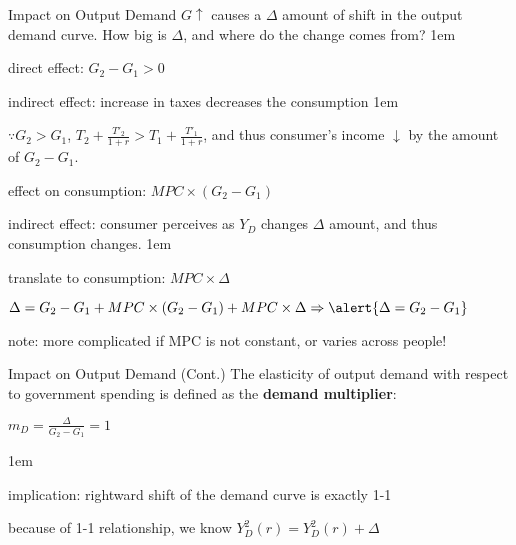 \documentclass[11pt,aspectratio=43]{beamer}
\let\olditemize=\itemize
\let\endolditemize=\enditemize
\renewenvironment{itemize}{\olditemize \itemsep1em}{\endolditemize}
\let\oldenumerate=\enumerate
\let\endoldenumerate=\endenumerate
\renewenvironment{enumerate}{\oldenumerate \itemsep1em}{ \endoldenumerate}
\theoremstyle{definition}
\begin{document}
\begin{frame}{Impact on Output Demand}
\label{slide:Impact_on_Output_Demand}
    $ G \uparrow  $ causes \alert{a $ \Delta $ amount of shift in the output demand curve}. How big is $ \Delta $, and where do the change comes from?
    \begin{enumerate}
        \item direct effect: $ G_{2} - G_{1} > 0 $
        \item indirect effect: increase in taxes decreases the consumption
        \begin{itemize}
            \item $ \because G_{2} > G_{1} $, $ T_{2} + \frac{T'_{2}}{1+r} > T_{1} + \frac{T'_{1}}{1+r} $, and thus consumer's income $ \downarrow  $ by the amount of $ G_{2} - G_{1} $.
            \item effect on consumption: $ MPC \times ( G_{2} - G_{1} ) $
        \end{itemize}
        \item indirect effect: consumer perceives as $ Y_{D} $ changes $ \Delta $ amount, and thus consumption changes.
        \begin{itemize}
            \item translate to consumption: $ MPC \times \Delta $
        \end{itemize}
    \end{enumerate}
    \begin{center}
        $ \displaystyle \Delta = G_{2} - G_{1} + MPC \times ( G_{2} - G_{1} ) + MPC \times \Delta \Rightarrow \alert{\Delta = G_{2} - G_{1}}$
    \end{center}
    note: more complicated if MPC is not constant, or varies across people!
\end{frame}

\begin{frame}{Impact on Output Demand (Cont.)}
\label{slide:Impact_on_Output_Demand__Cont__}
The \alert{elasticity} of output demand with respect to government spending is defined as the \textbf{demand multiplier}:
\begin{center}
    $ \displaystyle m_{D} = \frac{\Delta}{G_{2} - G_{1}} = 1 $
\end{center}
\begin{itemize}
    \item implication: rightward shift of the demand curve is exactly 1-1
    \item because of 1-1 relationship, we know \alert{$ Y_{D}^{2}( r ) = Y_{D}^{2}( r ) + \Delta $}
\end{itemize}

\end{frame}
\end{document}
